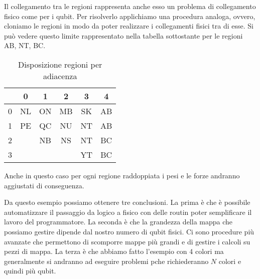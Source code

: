 Il collegamento tra le regioni rappresenta anche esso un problema di collegamento fisico come per i qubit. Per risolverlo applichiamo una procedura analoga, ovvero, cloniamo le regioni in modo da poter realizzare i collegamenti fisici tra di esse. Si può vedere questo limite rappresentato nella tabella sottostante per le regioni AB, NT, BC.
\begin{table}
  \begin{center}
    \begin{tabular}{ l | c | c | c | c | c }
        & 0  & 1  & 2  & 3  & 4  \\ \hline
      0 & NL & ON & MB & SK & AB \\
      1 & PE & QC & NU & NT & AB \\
      2 &    & NB & NS & NT & BC \\
      3 &    &    &    & YT & BC \\
    \end{tabular}
    \caption{Disposizione regioni per adiacenza}
  \end{center}
\end{table}
Anche in questo caso per ogni regione raddoppiata i pesi e le forze andranno aggiustati di conseguenza.

Da questo esempio possiamo ottenere tre conclusioni. La prima è che è possibile automatizzare il passaggio da logico a fisico con delle routin poter semplificare il lavoro del programmatore. La seconda è che la grandezza della mappa che possiamo gestire dipende dal nostro numero di qubit fisici. Ci sono procedure più avanzate che permettono di scomporre mappe più grandi e di gestire i calcoli su pezzi di mappa. La terza è che abbiamo fatto l'esempio con 4 colori ma generalmente si andranno ad eseguire problemi pche richiederanno $N$ colori e quindi più qubit.

